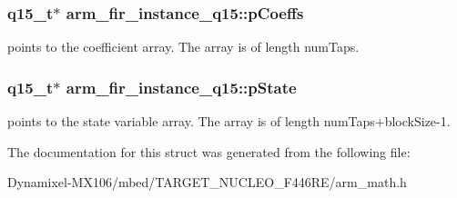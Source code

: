 \subsubsection[{\texorpdfstring{p\+Coeffs}{pCoeffs}}]{\setlength{\rightskip}{0pt plus 5cm}q15\+\_\+t$\ast$ arm\+\_\+fir\+\_\+instance\+\_\+q15\+::p\+Coeffs}\hypertarget{structarm__fir__instance__q15_a6d16db16a5f8f0db54938f2967244d9e}{}\label{structarm__fir__instance__q15_a6d16db16a5f8f0db54938f2967244d9e}
points to the coefficient array. The array is of length num\+Taps. 
\subsubsection[{\texorpdfstring{p\+State}{pState}}]{\setlength{\rightskip}{0pt plus 5cm}q15\+\_\+t$\ast$ arm\+\_\+fir\+\_\+instance\+\_\+q15\+::p\+State}\hypertarget{structarm__fir__instance__q15_aa8d25f44f45b6a6c4cf38c31569b8a01}{}\label{structarm__fir__instance__q15_aa8d25f44f45b6a6c4cf38c31569b8a01}
points to the state variable array. The array is of length num\+Taps+block\+Size-\/1. 

The documentation for this struct was generated from the following file\+:\begin{DoxyCompactItemize}
\item 
Dynamixel-\/\+M\+X106/mbed/\+T\+A\+R\+G\+E\+T\+\_\+\+N\+U\+C\+L\+E\+O\+\_\+\+F446\+R\+E/arm\+\_\+math.\+h\end{DoxyCompactItemize}
